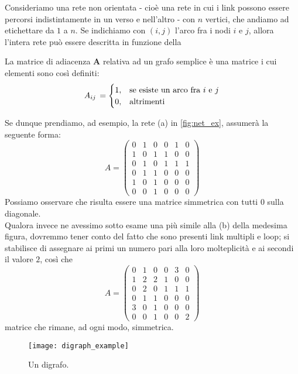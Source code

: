 Consideriamo una rete non orientata - cioè una rete in cui i link possono essere percorsi indistintamente in un verso e nell'altro - con $ n $ vertici, che andiamo ad etichettare da $ 1 $ a $ n $. Se indichiamo con $ \left( i, j \right) $ l'arco fra i nodi $ i $ e $ j $, allora l'intera rete può essere descritta in funzione della
\begin{definizione}
La matrice di adiacenza \textbf{A} relativa ad un grafo semplice è una matrice i cui elementi sono così definiti:
\[
A_{ij} \, =
\begin{cases}
1, & \text{se esiste un arco fra $ i $ e $ j $}\\ 
0, & \text{altrimenti}
\end{cases}
\]
\end{definizione}
Se dunque prendiamo, ad esempio, la rete (a) in \cref{fig:net_ex}, assumerà la seguente forma:
\begin{equation}
A =
\begin{pmatrix}
0 & 1 & 0 & 0 & 1 & 0 \\
1 & 0 & 1 & 1 & 0 & 0 \\
0 & 1 & 0 & 1 & 1 & 1 \\
0 & 1 & 1 & 0 & 0 & 0 \\
1 & 0 & 1 & 0 & 0 & 0 \\
0 & 0 & 1 & 0 & 0 & 0
\end{pmatrix}
\end{equation}
Possiamo osservare che risulta essere una matrice simmetrica con tutti $ 0 $ sulla diagonale. 
\\Qualora invece ne avessimo sotto esame una più simile alla (b) della medesima figura, dovremmo tener conto del fatto che sono presenti link multipli e loop; si stabilisce di assegnare ai primi un numero pari alla loro molteplicità e ai secondi il valore $ 2 $, così che
\begin{equation}
A =
\begin{pmatrix}
0 & 1 & 0 & 0 & 3 & 0 \\
1 & 2 & 2 & 1 & 0 & 0 \\
0 & 2 & 0 & 1 & 1 & 1 \\
0 & 1 & 1 & 0 & 0 & 0 \\
3 & 0 & 1 & 0 & 0 & 0 \\
0 & 0 & 1 & 0 & 0 & 2
\end{pmatrix}
\end{equation}
matrice che rimane, ad ogni modo, simmetrica.

\begin{wrapfigure}{l}{0.4\textwidth}
		\texttt{[image: digraph\_example]}
		\caption{Un digrafo. \cite{Newman}}
		\label{fig:dig_ex}
\end{wrapfigure}


